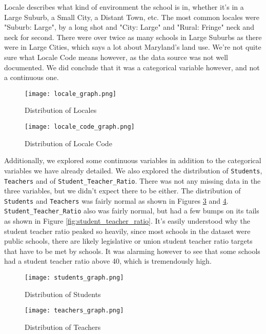 \documentclass[12pt]{article}
\begin{document}
Locale describes what kind of environment the school is in, whether it's in a Large Suburb,
a Small City, a Distant Town, etc. The most common locales were "Suburb: Large", by a long shot
and "City: Large" and "Rural: Fringe" neck and neck for second. There were over twice as many
schools in Large Suburbs as there were in Large Cities, which says a lot about Maryland's land
use. We're not quite sure what Locale Code means however, as the data source was not well
documented. We did conclude that it was a categorical variable however, and not a continuous 
one.\\

\begin{figure}[!htb]
  \centering
  \texttt{[image: locale\_graph.png]}
  \caption{Distribution of Locales}
  \label{fig:locale}
\end{figure}

\begin{figure}[!htb]
  \centering
  \texttt{[image: locale\_code\_graph.png]}
  \caption{Distribution of Locale Code}
  \label{fig:locale_code}
\end{figure}

Additionally, we explored some continuous variables in addition to the categorical
variables we have already detailed. We also explored the distribution of 
\texttt{Students}, \texttt{Teachers} and of \texttt{Student\_Teacher\_Ratio}. There
was not any missing data in the three variables, but we didn't expect there to be
either. The distribution of \texttt{Students} and \texttt{Teachers} was fairly
normal as shown in Figures \ref{fig:students} and \ref{fig:teachers}.
\texttt{Student\_Teacher\_Ratio} also was fairly normal, but had a few bumps
on its tails as shown in Figure \ref{fig:student_teacher_ratio}. It's easily
understood why the student teacher ratio peaked so heavily, since most schools
in the dataset were public schools, there are likely legislative or union student
teacher ratio targets that have to be met by schools. It was alarming however to
see that some schools had a student teacher ratio above 40, which is tremendously
high.\\

\begin{figure}[!htb]
  \centering
  \texttt{[image: students\_graph.png]}
  \caption{Distribution of Students}
  \label{fig:students}
\end{figure}

\begin{figure}[!htb]
  \centering
  \texttt{[image: teachers\_graph.png]}
  \caption{Distribution of Teachers}
  \label{fig:teachers}
\end{figure}
\end{document}
